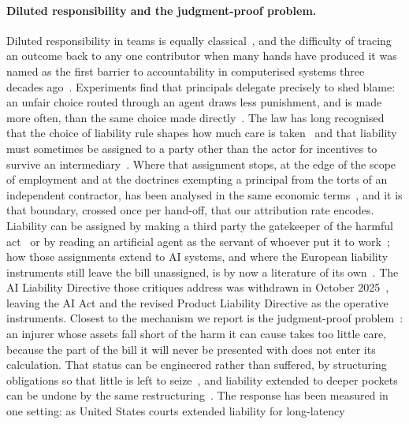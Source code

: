 \documentclass[11pt,a4paper]{article}
\theoremstyle{definition}
\begin{document}
\paragraph{Diluted responsibility and the judgment-proof problem.}
Diluted responsibility
in teams is equally classical~\citep{holmstrom1982moral}, and the difficulty of
tracing an outcome back to any one contributor when many hands have produced it
was named as the first barrier to accountability in computerised systems three
decades ago~\citep{nissenbaum1996accountability}. Experiments find
that principals delegate precisely to shed blame: an unfair choice routed
through an agent draws less punishment, and is made more often, than the same
choice made directly~\citep{bartling2012shifting,hamman2010selfinterest}. The
law has long recognised that the choice of liability rule shapes how much care
is taken~\citep{shavell1980strict} and that liability must sometimes be
assigned to a party other than the actor for incentives to survive an
intermediary~\citep{sykes1984vicarious}. Where that assignment stops, at the
edge of the scope of employment and at the doctrines exempting a principal from
the torts of an independent contractor, has been analysed in the same economic
terms~\citep{sykes1988boundaries}, and it is that boundary, crossed once per
hand-off, that our attribution rate encodes. Liability can be assigned by making
a third party the gatekeeper of the harmful act~\citep{kraakman1986gatekeepers}
or by reading an artificial agent as the servant of whoever put it to
work~\citep{lior2020respondeat}; how those assignments extend to AI systems,
and where the European liability instruments still leave the bill unassigned,
is by now a literature of its own~\citep{buiten2023law,hacker2023liability}.
The AI Liability Directive those critiques address was withdrawn in October
2025~\citep{euaild2025withdrawal}, leaving the AI Act and the revised Product
Liability Directive as the operative instruments.
Closest to the mechanism we report is the
judgment-proof problem~\citep{shavell1986judgment}: an injurer whose assets
fall short of the harm it can cause takes too little care, because the part of
the bill it will never be presented with does not enter its calculation. That
status can be engineered rather than suffered, by structuring obligations so
that little is left to seize~\citep{che2008strategic}, and liability extended
to deeper pockets can be undone by the same
restructuring~\citep{boyd1997search}. The response has been measured in one
setting: as United States courts extended liability for long-latency
\end{document}
